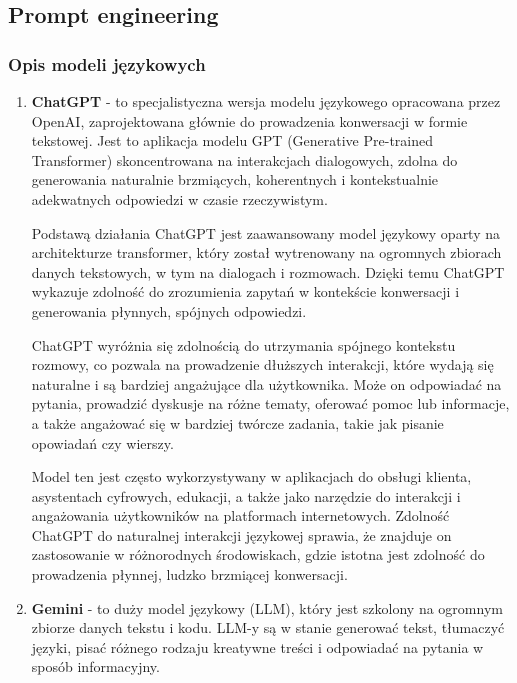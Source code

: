 \clearpage

\subsection{Prompt engineering}

\subsubsection{Opis modeli językowych}

\begin{enumerate}
 \item {\bf ChatGPT} - to specjalistyczna wersja modelu językowego opracowana przez OpenAI, zaprojektowana głównie do prowadzenia konwersacji w formie tekstowej. Jest to aplikacja modelu GPT (Generative Pre-trained Transformer) skoncentrowana na interakcjach dialogowych, zdolna do generowania naturalnie brzmiących, koherentnych i kontekstualnie adekwatnych odpowiedzi w czasie rzeczywistym.

    Podstawą działania ChatGPT jest zaawansowany model językowy oparty na architekturze transformer, który został wytrenowany na ogromnych zbiorach danych tekstowych, w tym na dialogach i rozmowach. Dzięki temu ChatGPT wykazuje zdolność do zrozumienia zapytań w kontekście konwersacji i generowania płynnych, spójnych odpowiedzi.
    
    ChatGPT wyróżnia się zdolnością do utrzymania spójnego kontekstu rozmowy, co pozwala na prowadzenie dłuższych interakcji, które wydają się naturalne i są bardziej angażujące dla użytkownika. Może on odpowiadać na pytania, prowadzić dyskusje na różne tematy, oferować pomoc lub informacje, a także angażować się w bardziej twórcze zadania, takie jak pisanie opowiadań czy wierszy.
    
    Model ten jest często wykorzystywany w aplikacjach do obsługi klienta, asystentach cyfrowych, edukacji, a także jako narzędzie do interakcji i angażowania użytkowników na platformach internetowych. Zdolność ChatGPT do naturalnej interakcji językowej sprawia, że znajduje on zastosowanie w różnorodnych środowiskach, gdzie istotna jest zdolność do prowadzenia płynnej, ludzko brzmiącej konwersacji.
    \\
    \item {\bf Gemini} - to duży model językowy (LLM), który jest szkolony na ogromnym zbiorze danych tekstu i kodu. LLM-y są w stanie generować tekst, tłumaczyć języki, pisać różnego rodzaju kreatywne treści i odpowiadać na pytania w sposób informacyjny.
    \\

\end{enumerate}

